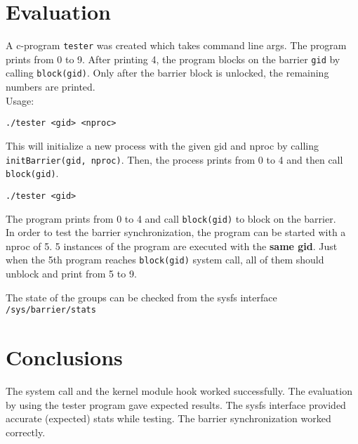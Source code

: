 \documentclass[12px]{report}
\begin{document}
\section{Evaluation}
A c-program \texttt{tester} was created which takes command line args. The program prints from 0 to 9. After printing 4, the program blocks on the barrier \texttt{gid} by calling \texttt{block(gid)}. Only after the barrier block is unlocked, the remaining numbers are printed.\\
Usage:
\begin{verbatim}
./tester <gid> <nproc>
\end{verbatim}
This will initialize a new process with the given gid and nproc by calling \texttt{initBarrier(gid, nproc)}.
Then, the process prints from 0 to 4 and then call \texttt{block(gid)}.
\begin{verbatim}
./tester <gid>
\end{verbatim}
The program prints from 0 to 4 and call \texttt{block(gid)} to block on the barrier.\\

In order to test the barrier synchronization, the program can be started with a nproc of 5. 5 instances of the program are executed with the \textbf{same gid}. Just when the 5th program reaches \texttt{block(gid)} system call, all of them should unblock and print from 5 to 9.

The state of the groups can be checked from the sysfs interface \texttt{/sys/barrier/stats}

\section{Conclusions}
The system call and the kernel module hook worked successfully. The evaluation by using the tester program gave expected results. The sysfs interface provided accurate (expected) stats while testing. The barrier synchronization worked correctly.
\end{document}
